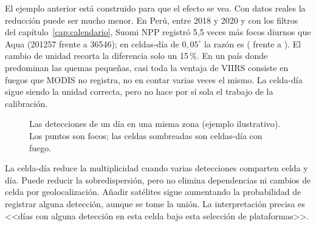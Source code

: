 \begin{atencion}
El ejemplo anterior está construido para que el efecto se vea. Con datos reales la reducción
puede ser mucho menor. En Perú, entre 2018 y 2020 y con los filtros del
capítulo~\ref{cap:calendario}, Suomi NPP registró 5,5 veces más focos diurnos que Aqua
(\num{201257} frente a \num{36546}); en celdas-día de $0{,}05^\circ$ la razón es
\PeruRatio{} (\PeruAjusteVIIRS{} frente a \PeruAjusteAqua{}). El cambio de unidad recorta
la diferencia solo un 15\,{}\%. En un país donde predominan las quemas pequeñas, casi toda
la ventaja de VIIRS consiste en fuegos que MODIS no registra, no en contar varias veces el
mismo. La celda-día sigue siendo la unidad correcta, pero no hace por sí sola el trabajo de
la calibración.
\end{atencion}

\begin{figure}[ht]
\centering
{}
\caption{Las detecciones de un día en una misma zona (ejemplo ilustrativo). Los puntos son
focos; las celdas sombreadas son celdas-día con fuego.}
\label{fig:celdadia}
\end{figure}

La celda-día reduce la multiplicidad cuando varias detecciones comparten celda y día.
Puede reducir la sobredispersión, pero no elimina dependencias ni cambios de celda
por geolocalización. Añadir satélites sigue aumentando la probabilidad de registrar
alguna detección, aunque se tome la unión. La interpretación precisa es <<días con
alguna detección en esta celda bajo esta selección de plataformas>>.

